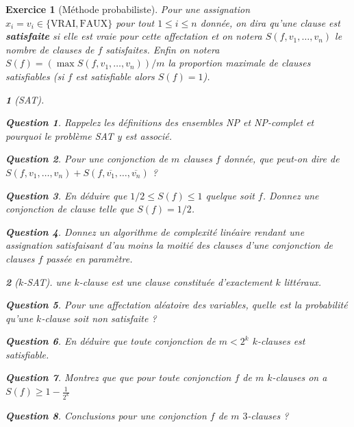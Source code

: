 \documentclass{article}
\theoremstyle{exostyle}
\newtheorem{exo}{Exercice}
\theoremstyle{partiestyle}
\newtheorem{partie}{}[exo]
\theoremstyle{questionstyle}
\newtheorem{questionpartie}{Question}[partie]
\begin{document}
\begin{exo}[Méthode probabiliste]
	Pour une assignation $x_i = v_i \in \{\text{VRAI}, \text{FAUX}\}$ pour tout $1 \leq i \leq n$ donnée, on dira qu'une clause est {\bf \em satisfaite} si elle est vraie pour cette affectation et on notera $S(f, v_1, \dots, v_n)$ le nombre de clauses de $f$ satisfaites. Enfin on notera $S(f) = (\max S(f, v_1, \dots, v_n))/m$ la proportion maximale de clauses satisfiables (si $f$ est satisfiable alors $S(f) =  1$).
	\begin{partie}[SAT]
	\begin{questionpartie}
		Rappelez les définitions des ensembles NP et NP-complet et pourquoi le problème SAT y est associé.
	\end{questionpartie}
	\begin{questionpartie}
	    Pour une conjonction de $m$ clauses $f$ donnée, que peut-on dire de $S(f, v_1, \dots, v_n) + S(f, \overline{v_1}, \dots, \overline{v_n})$ ?
	\end{questionpartie}
	\begin{questionpartie}
En déduire que $1/2 \leq S(f) \leq 1$ quelque soit $f$. Donnez une conjonction de clause telle que $S(f) = 1/2$.
	\end{questionpartie}
	\begin{questionpartie}
	Donnez un algorithme de complexité linéaire rendant une assignation satisfaisant d'au moins la moitié des clauses d'une conjonction de clauses $f$ passée en paramètre.
		\end{questionpartie}
	\end{partie}
	\begin{partie}[$k$-SAT]
		une $k$-clause est une clause constituée d'exactement $k$ littéraux.
		\begin{questionpartie}
			Pour une affectation aléatoire des variables, quelle est la probabilité qu'une $k$-clause soit non satisfaite ?
		\end{questionpartie}
		\begin{questionpartie}
			En déduire que toute conjonction de $m < 2^k$ $k$-clauses est satisfiable.
		\end{questionpartie}
		\begin{questionpartie}
			Montrez que que pour toute conjonction $f$ de $m$ $k$-clauses on a $S(f)\geq 1-\frac{1}{2^k}$
		\end{questionpartie}
		\begin{questionpartie}
			Conclusions pour une conjonction $f$ de $m$ $3$-clauses ?
		\end{questionpartie}
		
	\end{partie}



\end{exo}		
		
\end{document}
